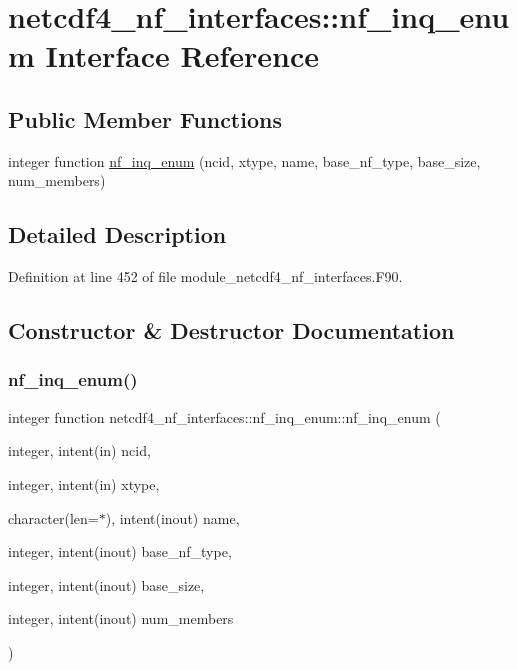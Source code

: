 \hypertarget{interfacenetcdf4__nf__interfaces_1_1nf__inq__enum}{}\section{netcdf4\+\_\+nf\+\_\+interfaces\+:\+:nf\+\_\+inq\+\_\+enum Interface Reference}
\label{interfacenetcdf4__nf__interfaces_1_1nf__inq__enum}
\subsection*{Public Member Functions}
\begin{DoxyCompactItemize}
\item 
integer function \hyperlink{interfacenetcdf4__nf__interfaces_1_1nf__inq__enum_abc301b64f08afd5608137ad4d5e067d9}{nf\+\_\+inq\+\_\+enum} (ncid, xtype, name, base\+\_\+nf\+\_\+type, base\+\_\+size, num\+\_\+members)
\end{DoxyCompactItemize}


\subsection{Detailed Description}


Definition at line 452 of file module\+\_\+netcdf4\+\_\+nf\+\_\+interfaces.\+F90.



\subsection{Constructor \& Destructor Documentation}
\mbox{\label{interfacenetcdf4__nf__interfaces_1_1nf__inq__enum_abc301b64f08afd5608137ad4d5e067d9}} 
\subsubsection{\texorpdfstring{nf\+\_\+inq\+\_\+enum()}{nf\_inq\_enum()}}
{\footnotesize\ttfamily integer function netcdf4\+\_\+nf\+\_\+interfaces\+::nf\+\_\+inq\+\_\+enum\+::nf\+\_\+inq\+\_\+enum (\begin{DoxyParamCaption}\item[{integer, intent(in)}]{ncid,  }\item[{integer, intent(in)}]{xtype,  }\item[{character(len=$\ast$), intent(inout)}]{name,  }\item[{integer, intent(inout)}]{base\+\_\+nf\+\_\+type,  }\item[{integer, intent(inout)}]{base\+\_\+size,  }\item[{integer, intent(inout)}]{num\+\_\+members }\end{DoxyParamCaption})}



